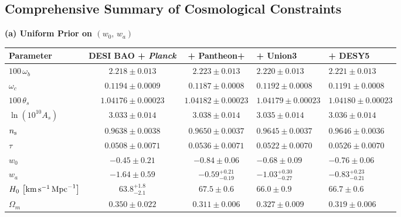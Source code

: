 \begin{subappendices}
\section{Comprehensive Summary of Cosmological Constraints}
\label{sec:ch11-app-constraints}
\vspace{-.5cm}
\begin{table}[hb!]
	\centering
	\scriptsize
	\textbf{(a) Uniform Prior on $(w_0,\,w_a)$}\\[4pt]
		\begingroup
		\renewcommand{\arraystretch}{1.05}
		\begin{tabularx}{\textwidth}{@{}>{\raggedright\arraybackslash}p{3.2cm} c c W W @{}}
			\toprule
			Parameter & DESI BAO + {\it Planck} & + Pantheon+ & + Union3 & + DESY5 \\
			\midrule[0.065em]
			$100\,\omega_b$ & $2.218 \pm 0.013$ & $2.223 \pm 0.013$ & $2.220 \pm 0.013$ & $2.221 \pm 0.013$ \\
			$\omega_c$ & $0.1194 \pm 0.0009$ & $0.1187 \pm 0.0008$ & $0.1192 \pm 0.0008$ & $0.1191 \pm 0.0008$ \\
			$100\,\theta_s$ & $1.04176 \pm 0.00023$ & $1.04182 \pm 0.00023$ & $1.04179 \pm 0.00023$ & $1.04180 \pm 0.00023$ \\
			$\ln\left(10^{10}A_s\right)$ & $3.033 \pm 0.014$ & $3.038 \pm 0.014$ & $3.035 \pm 0.014$ & $3.036 \pm 0.014$ \\
			$n_{\rm s}$ & $0.9638 \pm 0.0038$ & $0.9650 \pm 0.0037$ & $0.9645 \pm 0.0037$ & $0.9646 \pm 0.0036$ \\
			$\tau$ & $0.0508 \pm 0.0071$ & $0.0536 \pm 0.0071$ & $0.0522 \pm 0.0070$ & $0.0526 \pm 0.0070$ \\
			$w_0$ & $-0.45\pm 0.21$ & $-0.84\pm 0.06$ & $-0.68\pm 0.09$ & $-0.76\pm 0.06$ \\
			$w_a$ & $-1.64\pm 0.59$ & $-0.59^{+0.21}_{-0.19}$ & $-1.03^{+0.30}_{-0.27}$ & $-0.83^{+0.23}_{-0.21}$ \\
			$H_0\,\left[{\rm km}\,{\rm s}^{-1}\,{\rm Mpc}^{-1}\right]$ & $63.8^{+1.8}_{-2.1}$ & $67.5\pm 0.6$ & $66.0\pm 0.9$ & $66.7\pm 0.6$ \\
			$\Omega_m$ & $0.350\pm 0.022$ & $0.311\pm 0.006$ & $0.327\pm 0.009$ & $0.319\pm 0.006$ \\
			\bottomrule
		\end{tabularx}
		\endgroup

	\vspace{8pt}


\end{table}
\end{subappendices}
